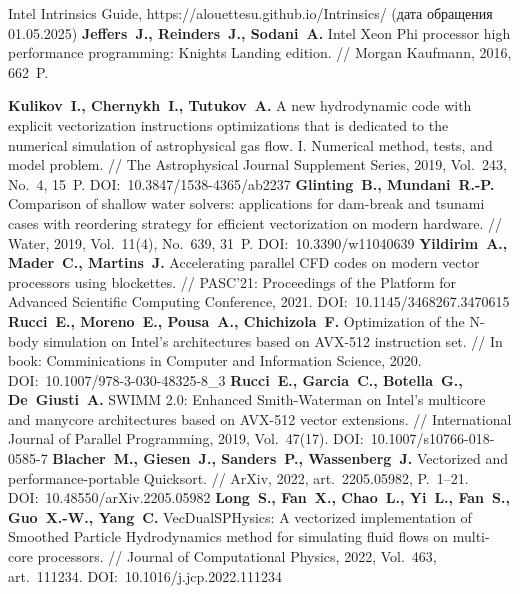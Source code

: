 \begin{thebibliography}{99}
Intel Intrinsics Guide, https://alouettesu.github.io/Intrinsics/ (дата обращения 01.05.2025)
\textbf{Jeffers~J., Reinders~J., Sodani~A.} Intel Xeon Phi processor high performance programming: Knights Landing edition. // Morgan Kaufmann, 2016, 662~P.

\textbf{Kulikov~I., Chernykh~I., Tutukov~A.} A new hydrodynamic code with explicit vectorization instructions optimizations that is dedicated to the numerical simulation of astrophysical gas flow. I. Numerical method, tests, and model problem. // The Astrophysical Journal Supplement Series, 2019, Vol.~243, No.~4, 15~P. DOI:~10.3847/1538-4365/ab2237
\textbf{Glinting~B., Mundani~R.-P.} Comparison of shallow water solvers: applications for dam-break and tsunami cases with reordering strategy for efficient vectorization on modern hardware. // Water, 2019, Vol.~11(4), No.~639, 31~P. DOI:~10.3390/w11040639
\textbf{Yildirim~A., Mader~C., Martins~J.} Accelerating parallel CFD codes on modern vector processors using blockettes. // PASC’21: Proceedings of the Platform for Advanced Scientific Computing Conference, 2021. DOI:~10.1145/3468267.3470615
\textbf{Rucci~E., Moreno~E., Pousa~A., Chichizola~F.} Optimization of the N-body simulation on Intel’s architectures based on AVX-512 instruction set. // In book: Comminications in Computer and Information Science, 2020. DOI:~10.1007/978-3-030-48325-8\_3
\textbf{Rucci~E., Garcia~C., Botella~G., De~Giusti~A.} SWIMM 2.0: Enhanced Smith-Waterman on Intel’s multicore and manycore architectures based on AVX-512 vector extensions. // International Journal of Parallel Programming, 2019, Vol.~47(17). DOI:~10.1007/s10766-018-0585-7
\textbf{Blacher~M., Giesen~J., Sanders~P., Wassenberg~J.} Vectorized and performance-portable Quicksort. // ArXiv, 2022, art.~2205.05982, P.~1–21. DOI:~10.48550/arXiv.2205.05982
\textbf{Long~S., Fan~X., Chao~L., Yi~L., Fan~S., Guo~X.-W., Yang~C.} VecDualSPHysics: A vectorized implementation of Smoothed Particle Hydrodynamics method for simulating fluid flows on multi-core processors. // Journal of Computational Physics, 2022, Vol.~463, art.~111234. DOI:~10.1016/j.jcp.2022.111234

\end{thebibliography}
